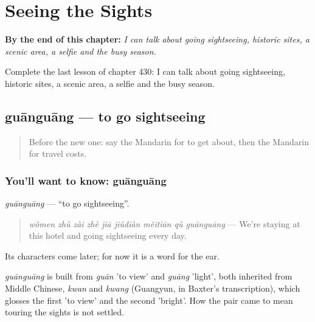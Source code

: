 
\chapter{Seeing the Sights}
\label{ch:zh-seeing-the-sights}

\begin{chapteropening}
\textbf{By the end of this chapter:} \emph{I can talk about going sightseeing, historic sites, a scenic area, a selfie and the busy season.}

Complete the last lesson of chapter 430: I can talk about going sightseeing, historic sites, a scenic area, a selfie and the busy season.
\end{chapteropening}

\section[guānguāng]{guānguāng — to go sightseeing}

\label{lesson:ZH-C430-guanguang}



\begin{quote}
Before the new one: say the Mandarin for to get about, then the Mandarin for travel costs.
\end{quote}

\subsection*{You'll want to know: guānguāng}
\emph{guānguāng} — \textquotedblleft{}to go sightseeing\textquotedblright{}.

\begin{quote}
\emph{wǒmen zhù zài zhè jiā jiǔdiàn měitiān qù guānguāng} — We're staying at this hotel and going sightseeing every day.
\end{quote}

Its characters come later; for now it is a word for the ear.

\begin{cousinweb}
\emph{guānguāng} is built from \emph{guān} 'to view' and \emph{guāng} 'light', both inherited from Middle Chinese, \emph{kwan} and \emph{kwang} (Guangyun, in Baxter's transcription), which glosses the first 'to view' and the second 'bright'. How the pair came to mean touring the sights is not settled.
\end{cousinweb}

